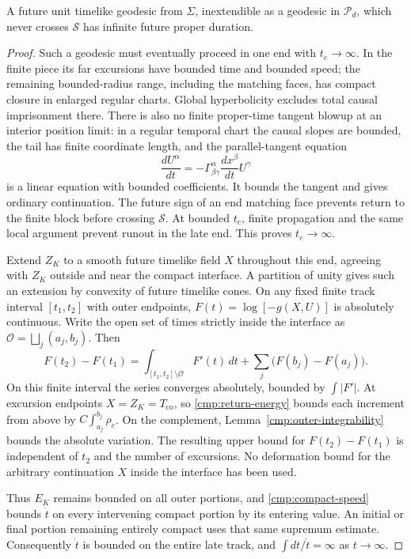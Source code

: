 \begin{proposition}\label{cmp:completeness}
A future unit timelike geodesic from $\Sigma$, inextendible as a
geodesic in $\mathcal P_d$, which never crosses $\mathcal S$ has
infinite future proper duration.
\end{proposition}

\begin{proof}
Such a geodesic must eventually proceed in one end with $t_e\to\infty$.
In the finite piece its far excursions have bounded time and bounded
speed; the remaining bounded-radius range, including the matching
faces, has compact closure in enlarged regular charts. Global
hyperbolicity excludes total causal imprisonment there. There is also
no finite proper-time tangent blowup at an interior position limit:
in a regular temporal chart the causal slopes are bounded, the tail has
finite coordinate length, and the parallel-tangent equation
\[
 \frac{dU^\alpha}{dt}
   =-\Gamma^\alpha_{\beta\gamma}
               \frac{dx^\beta}{dt}U^\gamma
\]
is a linear equation with bounded coefficients. It bounds the tangent
and gives ordinary continuation. The future sign of an end matching
face prevents return to the finite block before crossing
$\mathcal S$. At bounded $t_e$, finite propagation and the same local
argument prevent runout in the late end. This proves $t_e\to\infty$.

Extend $Z_K$ to a smooth future timelike field $X$ throughout this end,
agreeing with $Z_K$ outside and near the compact interface. A partition
of unity gives such an extension by convexity of future timelike cones.
On any fixed finite track interval $[t_1,t_2]$ with outer endpoints,
$F(t)=\log[-g(X,U)]$ is absolutely continuous. Write the open set of
times strictly inside the interface as
$\mathcal O=\bigsqcup_j(a_j,b_j)$. Then
\[
 F(t_2)-F(t_1)
  =\int_{[t_1,t_2]\setminus\mathcal O}F'(t)\,dt
      +\sum_j\bigl(F(b_j)-F(a_j)\bigr).
\]
On this finite interval the series converges absolutely, bounded by
$\int|F'|$. At excursion endpoints $X=Z_K=T_{\mathrm{co}}$,
so \eqref{cmp:return-energy} bounds each increment from above by
$C\int_{a_j}^{b_j}\rho_c$. On the complement,
Lemma~\ref{cmp:outer-integrability} bounds the absolute variation.
The resulting upper bound for $F(t_2)-F(t_1)$ is independent of
$t_2$ and the number of excursions. No deformation bound for the
arbitrary continuation $X$ inside the interface has been used.

Thus $E_K$ remains bounded on all outer portions, and
\eqref{cmp:compact-speed} bounds $\dot t$ on every intervening compact
portion by its entering value. An initial or final portion remaining
entirely compact uses that same supremum estimate. Consequently
$\dot t$ is bounded on the entire late track, and
$\int dt/\dot t=\infty$ as $t\to\infty$.
\end{proof}

